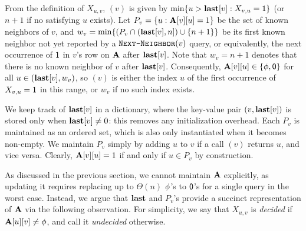 From the definition of $X_{u,v}$, $(v)$ is given by $\min\{u > \mathbf{last}[v]: X_{v,u} = \mathsf{1}\}$ (or $n+1$ if no satisfying $u$ exists). Let
$P_v = \{u: \mathbf{A}[v][u]=1\}$ be the set of known neighbors of $v$, and $w_v = \min \{(P_v \cap (\mathbf{last}[v], n]) \cup \{n+1\}\}$ be its first known neighbor not yet reported by a $\texttt{\textsc{Next-Neighbor}}(v)$ query, or equivalently, the next occurrence of $\mathsf{1}$ in $v$'s row on $\mathbf{A}$ after $\mathbf{last}[v]$. Note that $w_v = n+1$ denotes that there is no known neighbor of $v$ after $\mathbf{last}[v]$.
Consequently, $\mathbf{A}[v][u] \in \{\phi,\mathsf{0}\}$ for all $u \in (\mathbf{last}[v], w_v)$, so $(v)$ is
either the index $u$ of the first occurrence of $X_{v,u} = \mathsf{1}$ in this range, or $w_v$ if no such index exists.

We keep track of $\mathbf{last}[v]$ in a dictionary, where the key-value pair $(v,\mathbf{last}[v])$ is stored only when $\mathbf{last}[v] \neq 0$: this removes any initialization overhead.
Each $P_v$ is maintained as an ordered set, which is also only instantiated when it becomes non-empty.
We maintain $P_v$ simply by adding $u$ to $v$ if a call $(v)$ returns $u$, and vice versa. Clearly, $\mathbf{A}[v][u]=1$ if and only if $u \in P_v$ by construction.

As discussed in the previous section, we cannot maintain $\mathbf{A}$ explicitly, as updating it requires replacing up to $\Theta(n)$ $\phi$'s to $\mathsf{0}$'s for a single  query in the worst case. Instead, we argue that $\mathbf{last}$ and $P_v$'s provide a succinct representation of $\mathbf{A}$ via the following observation. For simplicity, we say that $X_{u,v}$ is \emph{decided} if $\mathbf{A}[u][v] \neq \phi$, and call it \emph{undecided} otherwise.

